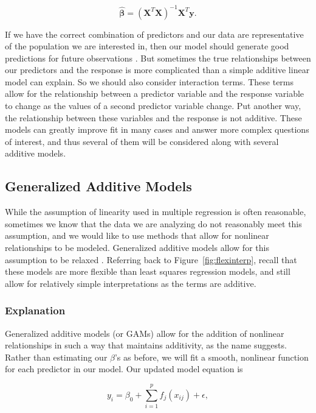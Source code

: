\documentclass[12pt]{article}\usepackage[]{graphicx}\usepackage[]{color}
\begin{document}
\begin{equation} \label{eq:beta}
\boldsymbol{\hat{\beta}}=(\boldsymbol{X}^{T}\boldsymbol{X})^{-1}\boldsymbol{X}^{T}\boldsymbol{y}.
\end{equation}

If we have the correct combination of predictors and our data are representative of the population we are interested in, then our model should generate good predictions for future observations \cite{lm}. But sometimes the true relationships between our predictors and the response is more complicated than a simple additive linear model can explain. So we should also consider interaction terms. These terms allow for the relationship between a predictor variable and the response variable to change as the values of a second predictor variable change. Put another way, the relationship between these variables and the response is not additive. These models can greatly improve fit in many cases and answer more complex questions of interest, and thus several of them will be considered along with several additive models.

\subsection{Generalized Additive Models}
While the assumption of linearity used in multiple regression is often reasonable, sometimes we know that the data we are analyzing do not reasonably meet this assumption, and we would like to use methods that allow for nonlinear relationships to be modeled. Generalized additive models allow for this assumption to be relaxed \cite{gam}. Referring back to Figure~\ref{fig:flexinterp}, recall that these models are more flexible than least squares regression models, and still allow for relatively simple interpretations as the terms are additive.

\subsubsection{Explanation}
Generalized additive models (or GAMs) allow for the addition of nonlinear relationships in such a way that maintains additivity, as the name suggests. Rather than estimating our $\beta$'s as before, we will fit a smooth, nonlinear function for each predictor in our model. Our updated model equation is

\begin{equation} \label{eq:gam}
y_{i}=\beta_{0}+\sum_{i=1}^{p} f_{j}(x_{ij})+\epsilon,
\end{equation}
\end{document}
